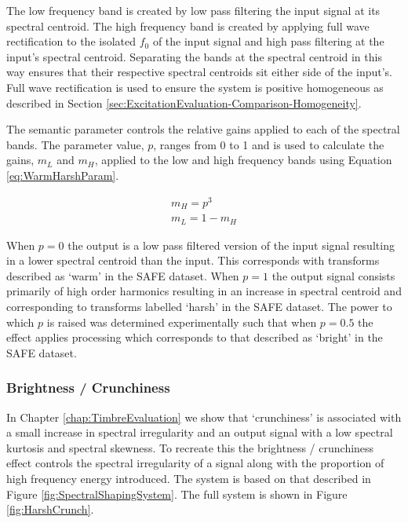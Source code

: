 			The low frequency band is created by low pass filtering the input signal at its spectral centroid.
			The high frequency band is created by applying full wave rectification to the isolated $f_{0}$ of
			the input signal and high pass filtering at the input's spectral centroid.  Separating the bands at
			the spectral centroid in this way ensures that their respective spectral centroids sit either side
			of the input's. Full wave rectification is used to ensure the system is positive homogeneous as
			described in Section \ref{sec:ExcitationEvaluation-Comparison-Homogeneity}.

			The semantic parameter controls the relative gains applied to each of the spectral bands. The
			parameter value, $p$, ranges from 0 to 1 and is used to calculate the gains, $m_{L}$ and $m_{H}$,
			applied to the low and high frequency bands using Equation \ref{eq:WarmHarshParam}.

			\begin{gather}
				m_{H} = p^{3} \nonumber \\
				m_{L} = 1 - m_{H}
				\label{eq:WarmHarshParam}
			\end{gather}

			When $p = 0$  the output is a low pass filtered version of the input signal resulting in a lower
			spectral centroid than the input. This corresponds with transforms described as `warm' in the SAFE
			dataset. When $p = 1$ the output signal consists primarily of high order harmonics resulting in an
			increase in spectral centroid and corresponding to transforms labelled `harsh' in the SAFE dataset.
			The power to which $p$ is raised was determined experimentally such that when $p = 0.5$ the effect
			applies processing which corresponds to that described as `bright' in the SAFE dataset. 

		\subsubsection*{Brightness / Crunchiness}
			In Chapter \ref{chap:TimbreEvaluation} we show that `crunchiness' is associated with a small
			increase in spectral irregularity and an output signal with a low spectral kurtosis and spectral
			skewness. To recreate this the brightness / crunchiness effect controls the spectral irregularity
			of a signal along with the proportion of high frequency energy introduced.  The system is based on
			that described in Figure \ref{fig:SpectralShapingSystem}. The full system is shown in Figure
			\ref{fig:HarshCrunch}.

